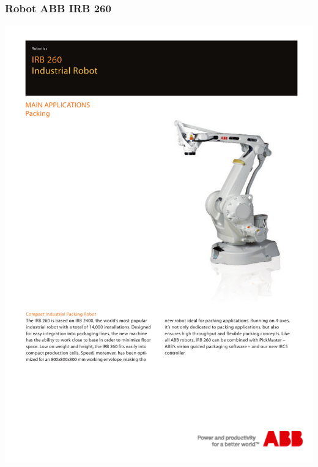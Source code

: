 \subsubsection{Robot ABB IRB 260}
\hspace*{-2cm}
\includegraphics[page=2]{Datasheets/IRB-260.pdf}
\newpage
